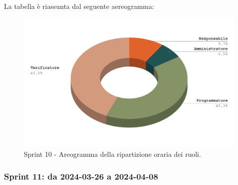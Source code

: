\documentclass[10pt, a4paper]{article}
\begin{document}
{{{{{{{{{{{{{{{{{{\paragraph{}La tabella è riassunta dal seguente aereogramma:
 \begin{figure}[H]
        \centering        
        \includegraphics[width=15.5cm]{aereogrammi/areogramma_10_periodo.png}
        \caption{Sprint 10 - Areogramma della ripartizione oraria dei ruoli. }
    \end{figure}



\subsubsection{Sprint 11: da 2024-03-26 a 2024-04-08}
}}}}}}}}}}}}}}}}}}
\end{document}
